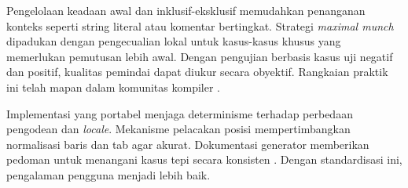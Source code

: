 \documentclass[../main.tex]{subfiles}
\begin{document}
Pengelolaan keadaan awal dan inklusif-eksklusif memudahkan penanganan konteks seperti string literal atau komentar bertingkat. Strategi \emph{maximal munch} dipadukan dengan pengecualian lokal untuk kasus-kasus khusus yang memerlukan pemutusan lebih awal. Dengan pengujian berbasis kasus uji negatif dan positif, kualitas pemindai dapat diukur secara obyektif. Rangkaian praktik ini telah mapan dalam komunitas kompiler \citep{Mogensen2010,FlexManual}.

\IfSubfilesClassLoaded{


}{}

Implementasi yang portabel menjaga determinisme terhadap perbedaan pengodean dan \emph{locale}. Mekanisme pelacakan posisi mempertimbangkan normalisasi baris dan tab agar akurat. Dokumentasi generator memberikan pedoman untuk menangani kasus tepi secara konsisten \citep{FlexManual}. Dengan standardisasi ini, pengalaman pengguna menjadi lebih baik.

\IfSubfilesClassLoaded{%


}{}
\end{document}
